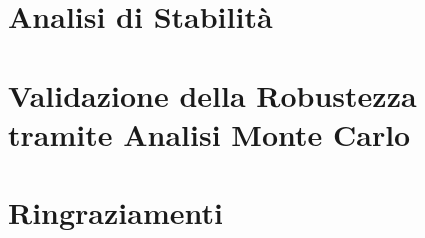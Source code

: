 \documentclass[a4paper,12pt]{report}
\begin{document}
% 

\chapter{Analisi di Stabilità}
\label{ch:stabilita}




%  

\chapter{Validazione della Robustezza tramite Analisi Monte Carlo}
\label{ch:montecarlo}



\chapter*{Ringraziamenti}
\label{ch:ringraziamenti}




\end{document}
